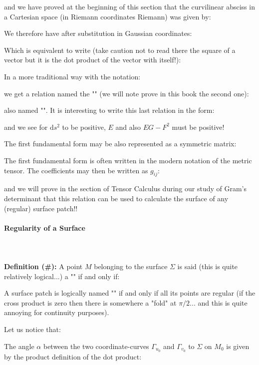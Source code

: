 {	and we have proved at the beginning of this section that the curvilinear absciss in a Cartesian space (in Riemann coordinates Riemann) was given by:
	
	We therefore have after substitution in Gaussian coordinates:
	
	Which is equivalent to write (take caution not to read there the square of a vector but it is the dot product of the vector with itself!):
	
	In a more traditional way with the notation:
	
	we get a relation named the "" (we will note prove in this book the second one):
	
	also named "". It is interesting to write this last relation in the form:
	
	and we see for $\mathrm{d}s^2$ to be positive, $E$ and also $EG-F^2$ must be positive!
	
	The first fundamental form may be also represented as a symmetric matrix:
	
	The first fundamental form is often written in the modern notation of the metric tensor. The coefficients may then be written as $g_{ij}$:
	
	and we will prove in the section of Tensor Calculus during our study of Gram's determinant that this relation can be used to calculate the surface of any (regular) surface patch!!
	
	\pagebreak
	\paragraph{Regularity of a Surface}\mbox{}\\\\
	\textbf{Definition (\#\mydef):} A point $M$ belonging to the surface $\Sigma$ is said (this is quite relatively logical...) a "" if and only if:
	
	A surface patch is logically named "" if and only if all its points are regular (if the cross product is zero then there is somewhere a "fold" at $\pi/2$... and this is quite annoying for continuity purposes).

	Let us notice that:
	
	The angle $\alpha$ between the two coordinate-curves $\Gamma_{u_0}$ and $\Gamma_{v_0}$ to $\Sigma$ on $M_0$ is given by the product definition of the dot product:
	
}
